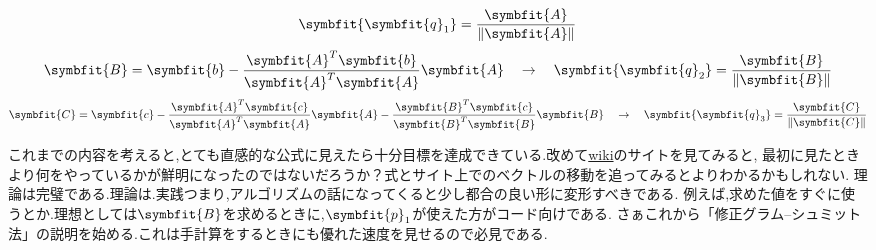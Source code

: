 \hypertarget{Gram}{}
\begin{tcolorbox}[colframe=black!80,colback=white,title=グラム--シュミットの正規直交化法]
\[\symbfit{\symbfit{q}_1}=\displaystyle\frac{\symbfit{A}}{\|\symbfit{A}\|}\]
\[\symbfit{B}=\symbfit{b}-\displaystyle\frac{\symbfit{A}^T\symbfit{b}}{\symbfit{A}^T\symbfit{A}}\symbfit{A}\quad \rightarrow \quad \symbfit{\symbfit{q}_2}=\displaystyle\frac{\symbfit{B}}{\|\symbfit{B}\|}\]
\[\symbfit{C}=\symbfit{c}-
\displaystyle\frac{\symbfit{A}^T\symbfit{c}}{\symbfit{A}^T\symbfit{A}}\symbfit{A}-
\displaystyle\frac{\symbfit{B}^T\symbfit{c}}{\symbfit{B}^T\symbfit{B}}\symbfit{B}\quad \rightarrow \quad \symbfit{\symbfit{q}_3}=\displaystyle\frac{\symbfit{C}}{\|\symbfit{C}\|}\]
\end{tcolorbox}
これまでの内容を考えると,とても直感的な公式に見えたら十分目標を達成できている.改めて\hyperlink{wiki}{wiki}のサイトを見てみると,
最初に見たときより何をやっているかが鮮明になったのではないだろうか？式とサイト上でのベクトルの移動を追ってみるとよりわかるかもしれない.
理論は完璧である.理論は.実践つまり,アルゴリズムの話になってくると少し都合の良い形に変形すべきである.
例えば,求めた値をすぐに使うとか.理想としては$\symbfit{B}$を求めるときに,$\symbfit{p}_1$が使えた方がコード向けである.
さぁこれから「修正グラム–シュミット法」の説明を始める.これは手計算をするときにも優れた速度を見せるので必見である.
